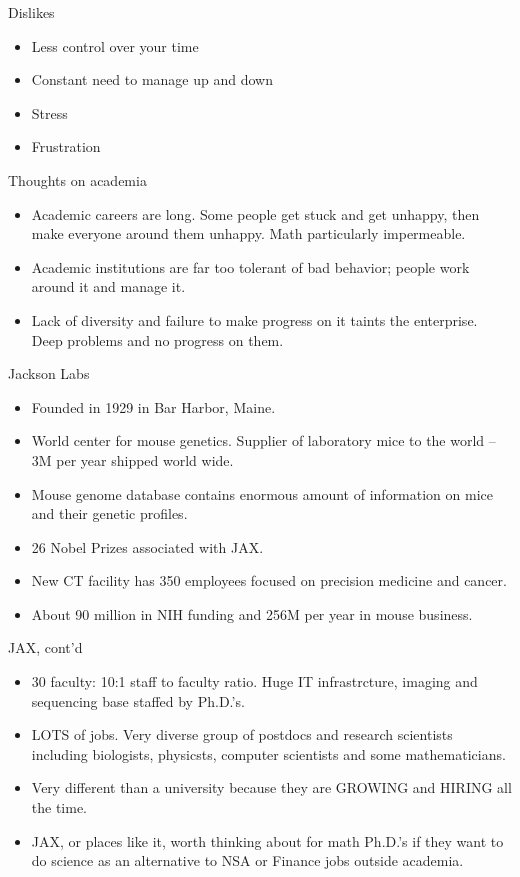 \documentclass{beamer}
\begin{document}
\begin{frame}{Dislikes}
\begin{itemize}
\item Less control over your time
  \item Constant need to manage up and down
  \item Stress
  \item Frustration
\end{itemize}
\end{frame}

\begin{frame}{Thoughts on academia}
  \begin{itemize}
  \item Academic careers are long.  Some people get stuck and get unhappy, then make everyone around them unhappy. Math particularly impermeable.
  \item Academic institutions are far too tolerant of bad behavior; people work around it and manage it.
  \item Lack of diversity and failure to make progress on it taints the enterprise.  Deep problems and no progress on them.
  \end{itemize}
\end{frame}

\begin{frame}{Jackson Labs}
  \begin{itemize}
  \item Founded in 1929 in Bar Harbor, Maine.
  \item World center for mouse genetics.  Supplier of laboratory  mice to the world -- 3M per year shipped world wide.
  \item Mouse genome database contains enormous amount of information on mice and their genetic profiles.
  \item 26 Nobel Prizes associated with JAX.
  \item New CT facility has 350 employees focused on precision medicine and cancer.
  \item About 90 million in NIH funding and 256M per year in mouse business.
  \end{itemize}
\end{frame}
\begin{frame}{JAX, cont'd}
  \begin{itemize}
  \item 30 faculty: 10:1 staff to faculty ratio.  Huge IT infrastrcture, imaging and sequencing base staffed by Ph.D.'s.
  \item LOTS of jobs.  Very diverse group of postdocs and research scientists including biologists, physicsts, computer scientists and some mathematicians.
  \item Very different than a university because they are GROWING and HIRING all the time.
  \item JAX, or places like it, worth thinking about for math Ph.D.'s if they want to do science as an alternative to NSA or Finance jobs outside academia.
  \end{itemize}
\end{frame}
        
\end{document}
